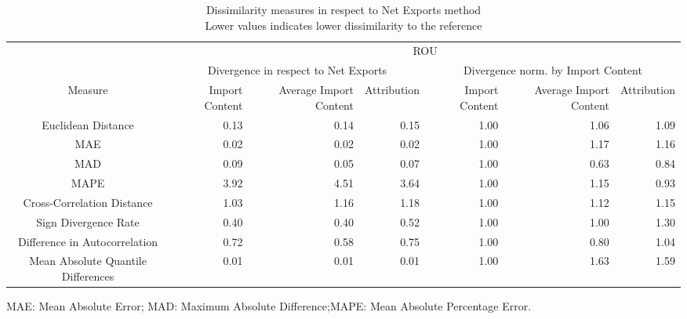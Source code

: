 \begin{table}[t]
\caption*{
{\large Dissimilarity measures in respect to Net Exports method} \\ 
{\small Lower values indicates lower dissimilarity to the reference}
} 
\fontsize{15.0pt}{18.0pt}\selectfont
\begin{tabular*}{\linewidth}{@{\extracolsep{\fill}}crrrrrr}
\toprule
 & \multicolumn{6}{c}{ROU} \\ 
\cmidrule(lr){2-7}
 & \multicolumn{3}{c}{Divergence in respect to Net Exports} & \multicolumn{3}{c}{Divergence norm. by Import Content} \\ 
\cmidrule(lr){2-4} \cmidrule(lr){5-7}
Measure & Import Content & Average Import Content & Attribution & Import Content & Average Import Content & Attribution \\ 
\midrule\addlinespace[2.5pt]
Euclidean Distance & 0.13 & 0.14 & 0.15 & 1.00 & 1.06 & 1.09 \\ 
MAE & 0.02 & 0.02 & 0.02 & 1.00 & 1.17 & 1.16 \\ 
MAD & 0.09 & 0.05 & 0.07 & 1.00 & 0.63 & 0.84 \\ 
MAPE & 3.92 & 4.51 & 3.64 & 1.00 & 1.15 & 0.93 \\ 
Cross-Correlation Distance & 1.03 & 1.16 & 1.18 & 1.00 & 1.12 & 1.15 \\ 
Sign Divergence Rate & 0.40 & 0.40 & 0.52 & 1.00 & 1.00 & 1.30 \\ 
Difference in Autocorrelation & 0.72 & 0.58 & 0.75 & 1.00 & 0.80 & 1.04 \\ 
Mean Absolute Quantile Differences & 0.01 & 0.01 & 0.01 & 1.00 & 1.63 & 1.59 \\ 
\bottomrule
\end{tabular*}
\begin{minipage}{\linewidth}
MAE: Mean Absolute Error; MAD: Maximum Absolute Difference;MAPE: Mean Absolute Percentage Error.\\
\end{minipage}
\end{table}


